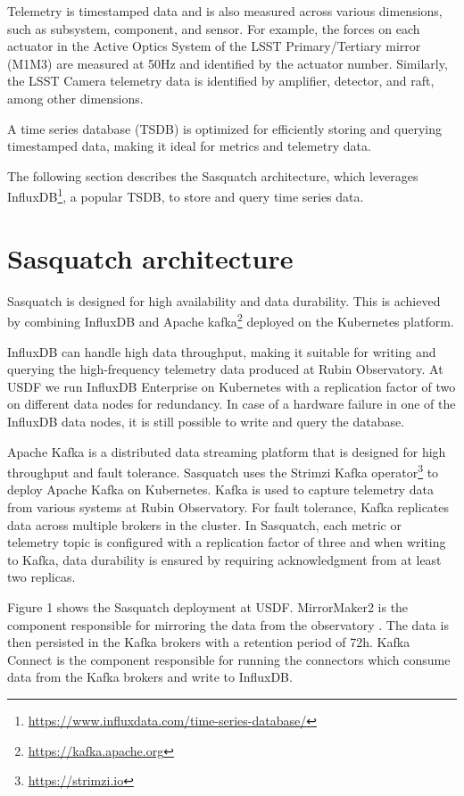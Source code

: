 Telemetry is timestamped data and is also measured across various dimensions, such as subsystem, component, and sensor. For example, the forces on each actuator in the Active Optics System of the LSST Primary/Tertiary mirror (M1M3) are measured at 50Hz and identified by the actuator number. Similarly, the LSST Camera telemetry data is identified by amplifier, detector, and raft, among other dimensions.

A time series database (TSDB) is optimized for efficiently storing and querying timestamped data, making it ideal for metrics and telemetry data.

The following section describes the Sasquatch architecture, which leverages InfluxDB\footnote{\url{https://www.influxdata.com/time-series-database/}}, a popular TSDB, to store and query time series data.

\section{Sasquatch architecture}

Sasquatch is designed for high availability and data durability. This is achieved by combining InfluxDB and Apache kafka\footnote{\url{https://kafka.apache.org}} deployed on the Kubernetes platform. \cite{SQR-029,SQR-068}

InfluxDB can handle high data throughput, making it suitable for writing and querying the high-frequency telemetry data produced at Rubin Observatory. At USDF we run InfluxDB Enterprise on Kubernetes with a replication factor of two on different data nodes for redundancy. In case of a hardware failure in one of the InfluxDB data nodes, it is still possible to write and query the database.

Apache Kafka is a distributed data streaming platform that is designed for high throughput and fault tolerance. Sasquatch uses the Strimzi Kafka operator\footnote{\url{https://strimzi.io}} to deploy Apache Kafka on Kubernetes. Kafka is used to capture telemetry data from various systems at Rubin Observatory. For fault tolerance, Kafka replicates data across multiple brokers in the cluster. In Sasquatch, each metric or telemetry topic is configured with a replication factor of three and when writing to Kafka, data durability is ensured by requiring acknowledgment from at least two replicas.

Figure 1 shows the Sasquatch deployment at USDF. MirrorMaker2 is the component responsible for mirroring the data from the observatory \cite{SQR-050}. The data is then persisted in the Kafka brokers with a retention period of 72h. Kafka Connect is the component responsible for running the connectors which consume data from the Kafka brokers and write to InfluxDB.


